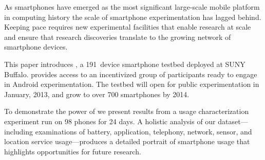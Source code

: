 As smartphones have emerged as the most significant large-scale mobile
platform in computing history the scale of smartphone experimentation has
lagged behind. Keeping pace requires new experimental facilities that enable
research at scale and ensure that research discoveries translate to the
growing network of smartphone devices.


This paper introduces \PhoneLab{}, a 191~device smartphone testbed deployed
at SUNY Buffalo. \PhoneLab{} provides access to an incentivized group of
participants ready to engage in Android experimentation. The testbed will
open for public experimentation in January, 2013, and grow to over 700
smartphones by 2014.



To demonstrate the power of \PhoneLab{} we present results from a usage
characterization experiment run on 98 phones for 24 days. A holistic analysis
of our dataset---including examinations of battery, application, telephony,
network, sensor, and location service usage---produces a detailed portrait of
smartphone usage that highlights opportunities for future research.
